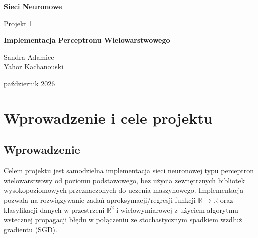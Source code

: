 \documentclass[11pt,a4paper]{article}
\begin{document}
\begin{titlepage}
    \centering
    {\fontsize{60}{30}\selectfont \textbf{Sieci Neuronowe} \par}
    \vspace{1.5cm}
    {\fontsize{30}{20}\selectfont Projekt 1 \par}
    \vspace{5cm}
    {\fontsize{36}{20}\selectfont \textbf{Implementacja Perceptronu Wielowarstwowego} \par}
    \vspace{7.5cm}
    
    {\fontsize{26}{20}\selectfont  
    Sandra Adamiec\\
    Yahor Kachanouski
    \par}
    \vspace{0.5cm}
    \vfill
    
    {\large październik 2026 \par}
    
\end{titlepage}

\tableofcontents
\newpage

\section{Wprowadzenie i cele projektu}

\subsection{Wprowadzenie}
Celem projektu jest samodzielna implementacja sieci neuronowej typu perceptron wielowarstwowy od poziomu podstawowego, bez użycia zewnętrznych bibliotek wysokopoziomowych przeznaczonych do uczenia maszynowego. Implementacja pozwala na rozwiązywanie zadań aproksymacji/regresji funkcji $\mathbb{R} \to \mathbb{R}$ oraz klasyfikacji danych w przestrzeni $\mathbb{R}^2$ i wielowymiarowej z użyciem algorytmu wstecznej propagacji błędu w połączeniu ze stochastycznym spadkiem wzdłuż gradientu (SGD).
\end{document}
